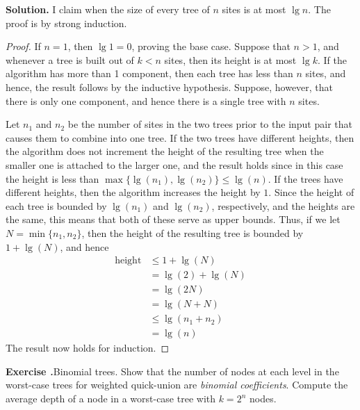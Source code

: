 \documentclass[12pt, a4paper]{article}
\newenvironment{ex}[2][Exercise]
{\par\medskip\noindent \textbf{#1 #2.}}
{\medskip}
\newenvironment{sol}[1][Solution]
{\par\medskip\noindent \textbf{#1.} }
{\medskip}
\begin{document}
	\begin{sol}
		I claim when the size of every tree of $n$ sites is at most $\lg n$. The proof is
		by strong induction.
		\begin{proof}
			If $n=1$, then $\lg 1=0$, proving the base case. Suppose that $n>1$, and whenever a tree
			is built out of $k<n$ sites, then its height is at most $\lg k$. If the algorithm
			has more than 1 component, then each tree has less than $n$ sites, and hence, the
			result follows by the inductive hypothesis. Suppose, however, that there is
			only one component, and hence there is a single tree with $n$ sites.
			
			Let  $n_1$ and $n_2$ be the number of sites in the two trees prior to the input pair
			that causes them to combine into one tree. If the two trees have different heights,
			then the algorithm does not increment the height of the resulting tree when the
			smaller one is attached to the larger one, and the result holds since in this
			case the height is less than $\max\{\lg(n_1), \lg(n_2)\}\leq \lg(n)$. If the
			trees have different heights, then the algorithm increases the height by $1$.
			Since the height of each tree is bounded by $\lg(n_1)$ and $\lg(n_2)$, respectively,
			and the heights are the same, this means that both of these serve as upper bounds.
			Thus, if we let $N=\min\{n_1,n_2\}$, then the height of the resulting tree
			is bounded by $1 + \lg(N)$, and hence
			\begin{align*}
				\text{height}& \leq 1 + \lg (N)\\
				 &=\lg(2) + \lg(N)\\
				 &=\lg(2N)\\
				 &=\lg (N + N)\\
				 &\leq \lg(n_1 + n_2)\\
				 &=\lg(n)
			\end{align*}
			The result now holds for induction.
		\end{proof}
	\end{sol}
	\begin{ex}{15}
		\emph{Binomial trees}. Show that the number of nodes at each level in the worst-case
		trees for weighted quick-union are \emph{binomial coefficients}. Compute the average
		depth of a node in a worst-case tree with $k=2^n$ nodes.
	\end{ex}
\end{document}
